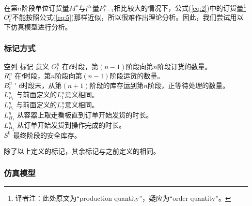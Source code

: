 在第$n$阶段单位订货量$M^n$与产量$P_{t-1}^n$相比较大的情况下，公式(\ref{eq:2})中的订货量\footnote{译者注：此处原文为“production quantity”，疑应为“order quantity”。}$O_t^n$不能按照公式(\ref{eq:5})那样近似，所以很难作出理论分析。因此，我们尝试用以下仿真模型进行分析。

\subsubsection{标记方式}

\begin{tabbing}
空列 \= 标记 \= 意义 \kill
\>\> $O_t^n$ \' 在$t$时段，第$(n-1)$阶段向第$n$阶段订货的数量。 \\
\>\> $R_t^n$ \' 在$t$时段，第$n$阶段向第$(n-1)$阶段运货的数量。 \\
\>\> $B_t^n$ \' $t$时段末，从第$(n+1)$阶段的库存运到第$n$阶段，正等待处理的数量。 \\
\>\> $L_{P_1}^n$ \' 与前面定义的$L_1^n$意义相同。 \\
\>\> $L_{P_2}^n$ \' 与前面定义的$L_2^n$意义相同。 \\
\>\> $L_{H_1}^n$ \' 从容器上取走看板直到订单开始发货的时长。 \\
\>\> $L_{H_2}^n$ \' 从订单开始发货到操作完成的时长。 \\
\>\> $S^0$ \' 最终阶段的安全库存。
\end{tabbing}

除了以上定义的标记，其余标记与之前定义的相同。

\subsubsection{仿真模型}

